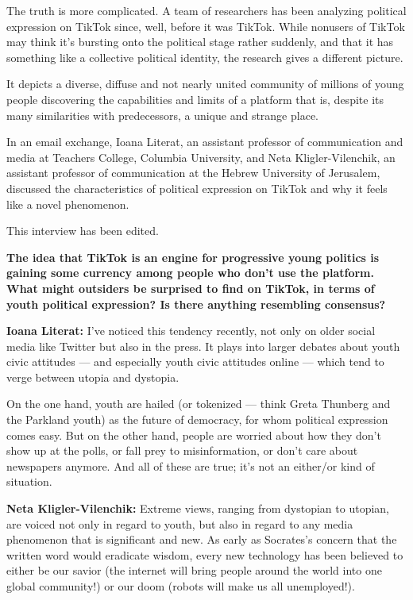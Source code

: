 The truth is more complicated. A team of researchers has been analyzing
political expression on TikTok since, well, before it was TikTok. While
nonusers of TikTok may think it's bursting onto the political stage
rather suddenly, and that it has something like a collective political
identity, the research gives a different picture.

It depicts a diverse, diffuse and not nearly united community of
millions of young people discovering the capabilities and limits of a
platform that is, despite its many similarities with predecessors, a
unique and strange place.

In an email exchange, Ioana Literat, an assistant professor of
communication and media at Teachers College, Columbia University, and
Neta Kligler-Vilenchik, an assistant professor of communication at the
Hebrew University of Jerusalem, discussed the characteristics of
political expression on TikTok and why it feels like a novel phenomenon.

This interview has been edited.

\textbf{The idea that TikTok is an engine for progressive young politics
is gaining some currency among people who don't use the platform. What
might outsiders be surprised to find on TikTok, in terms of youth
political expression? Is there anything resembling consensus?}

\textbf{Ioana Literat:} I've noticed this tendency recently, not only on
older social media like Twitter but also in the press. It plays into
larger debates about youth civic attitudes --- and especially youth
civic attitudes online --- which tend to verge between utopia and
dystopia.

On the one hand, youth are hailed (or tokenized --- think Greta Thunberg
and the Parkland youth) as the future of democracy, for whom political
expression comes easy. But on the other hand, people are worried about
how they don't show up at the polls, or fall prey to misinformation, or
don't care about newspapers anymore. And all of these are true; it's not
an either/or kind of situation.

\textbf{Neta Kligler-Vilenchik:} Extreme views, ranging from dystopian
to utopian, are voiced not only in regard to youth, but also in regard
to any media phenomenon that is significant and new. As early as
Socrates's concern that the written word would eradicate wisdom, every
new technology has been believed to either be our savior (the internet
will bring people around the world into one global community!) or our
doom (robots will make us all unemployed!).

